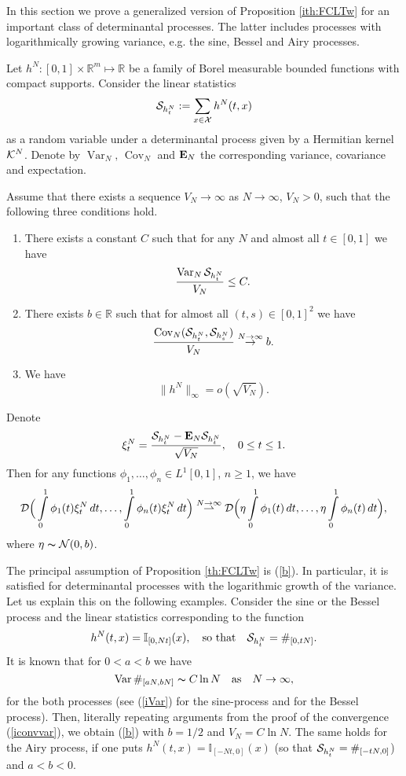 \documentclass{article}
\numberwithin{equation}{section}
\newcommand{\mR}{\mathbb{R}}
\newcommand{\mI}{\mathbb{I}}
\newcommand{\DD}{{\cal D}}
\newcommand{\NN}{{\cal N}}
\newcommand{\SSS}{{\cal S}}
\newcommand{\KK}{{\cal K}}
\newcommand{\XX}{{\cal X}}
\newcommand{\Cov}{\operatorname{Cov}}
\newcommand{\Var}{\operatorname{Var}}
\newcommand{\MON}{\mbox{\bf E}_N}
\newcommand{\ra}{\rightarrow}
\newcommand{\volna}{\thicksim}
\newcommand{\raw}{\rightharpoonup}
\newcommand{\os}{\overset}
\newcommand{\fr}{\frac}
\newcommand{\qmb}{\quad\mbox}
\newcommand{\qu}{\quad}
\newcommand{\sli}{\sum\limits}
\newcommand{\ili}{\int\limits}
\newcommand{\lbl}{\label}
\newcommand{\ass}{\quad\mbox{as}\quad}
\newcommand{\rprop}{Proposition \nolinebreak}
\newcommand{\bee}{\begin{equation}}
\newcommand{\eee}{\end{equation}}
\newcommand{\bpp}{\begin{prop}}
\newcommand{\epp}{\end{prop}}
\newcommand{\non}{\nonumber}
\begin{document}
In this section we prove a generalized version of  \rprop  \ref{ith:FCLTw}
for an important class of determinantal processes.
The latter includes processes with logarithmically growing variance,
e.g. the sine, Bessel and Airy processes.

Let $h^N:[0,1]\times \mR^m\mapsto\mR$ be a family of Borel measurable bounded functions with compact supports.
Consider the linear statistics
$$
\SSS_{h_t^N}:=\sli_{x\in\XX} h^N(t,x)
$$
as a random variable under a determinantal process given by a Hermitian kernel $\KK^N$.
Denote by $\Var_N,\,\Cov_N$ and $\MON$ the corresponding variance, covariance and  expectation.
\bpp\label{th:FCLTw}
Assume that there exists a sequence
$V_N\ra\infty$ as $N\ra\infty$,
$V_N>0$,
such that the following
three conditions hold.
\begin{enumerate}
\item
There exists a constant $C$ such that for any $N$ and almost all $t\in [0,1]$ we have
\bee\lbl{1cond}
\fr{\Var_N\SSS_{h_t^N}}{V_N}\leq C.
\eee


\item
There exists $b\in\mR$ such that
for almost all
$(t,s)\in [0,1]^2$ we have
\bee\label{b}
\fr{\Cov_N (\SSS_{h_t^N},\SSS_{h_s^N})}{V_N}\os{N\ra\infty}\ra b.
\eee

\item
We have
\bee\non
\|h^N\|_\infty = o(\sqrt {V_N}).
\eee
\end{enumerate}
Denote
$$
\xi^N_t=\fr{\SSS_{h_t^N}-\MON\SSS_{h_t^N}}{\sqrt{V_N}}, \quad 0\leq t \leq 1.
$$
Then for any functions $\phi_1,\ldots,\phi_n\in L^1 [0,1]$, $n\geq 1$, we have
\bee\lbl{fxiN}
\DD\Big(\ili_{0}^{1} \phi_1(t)\xi^N_t \, dt,\ldots, \ili_{0}^{1} \phi_n(t)\xi^N_t \, dt\Big) \os{N\ra\infty}\raw
\DD\Big(\eta\ili_{0}^{1} \phi_1(t)\,dt,\ldots,\eta\ili_{0}^{1} \phi_n(t)\,dt \Big),
\eee
where $\eta\volna\NN(0,b)$.
\epp
The principal assumption of \rprop \ref{th:FCLTw} is (\ref{b}).
In particular, it is satisfied for determinantal processes
with the logarithmic growth of the variance.
Let us explain this on the following examples.
Consider the sine or the Bessel process and
the linear statistics corresponding to the function
$$
h^N(t,x)=\mI_{[0,Nt]}(x),
\qmb{so that}\qu
\SSS_{h^N_t}=\#_{[0,tN]}.
$$
It is known that for $0<a<b$ we have
$$
\Var\#_{[aN,bN]}\volna C\ln N \ass N\ra\infty,
$$
for the both processes  (see (\ref{iVar}) for the sine-process and \cite{SoAB} for the Bessel process).
Then, literally repeating arguments from the proof of the convergence (\ref{iconvvar}),
we obtain (\ref{b}) with $b=1/2$ and $V_N=C\ln N$.
The same holds for the Airy process,
if one puts
$h^N(t,x)=\mI_{[-Nt,0]}(x)$
(so that
$\SSS_{h_t^N}=\#_{[-tN,0]}$)
and
$a<b<0$.
\end{document}
